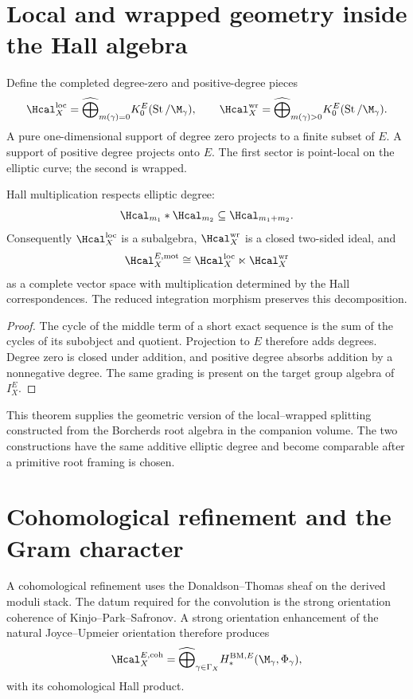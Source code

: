 \chapter{Local and wrapped geometry inside the Hall algebra}
Define the completed degree-zero and positive-degree pieces
\[
 \Hcal_X^{\mathrm{loc}}
 =\widehat\bigoplus_{m(\gamma)=0}
 K_0^E(\operatorname{St}/\M_\gamma),
 \qquad
 \Hcal_X^{\mathrm{wr}}
 =\widehat\bigoplus_{m(\gamma)>0}
 K_0^E(\operatorname{St}/\M_\gamma).
\]
A pure one-dimensional support of degree zero projects to a finite subset of $E$.  A support of positive degree projects onto $E$.  The first sector is point-local on the elliptic curve; the second is wrapped.

\begin{theorem}
Hall multiplication respects elliptic degree:
\[
 \Hcal_{m_1}*\Hcal_{m_2}\subseteq\Hcal_{m_1+m_2}.
\]
Consequently $\Hcal_X^{\mathrm{loc}}$ is a subalgebra, $\Hcal_X^{\mathrm{wr}}$ is a closed two-sided ideal, and
\[
 \Hcal_X^{E,\mathrm{mot}}
 \cong
 \Hcal_X^{\mathrm{loc}}\ltimes\Hcal_X^{\mathrm{wr}}
\]
as a complete vector space with multiplication determined by the Hall correspondences.  The reduced integration morphism preserves this decomposition.
\end{theorem}
\begin{proof}
The cycle of the middle term of a short exact sequence is the sum of the cycles of its subobject and quotient.  Projection to $E$ therefore adds degrees.  Degree zero is closed under addition, and positive degree absorbs addition by a nonnegative degree.  The same grading is present on the target group algebra of $I_X^E$.
\end{proof}

This theorem supplies the geometric version of the local--wrapped splitting constructed from the Borcherds root algebra in the companion volume.  The two constructions have the same additive elliptic degree and become comparable after a primitive root framing is chosen.

\chapter{Cohomological refinement and the Gram character}
A cohomological refinement uses the Donaldson--Thomas sheaf on the derived moduli stack.  The datum required for the convolution is the strong orientation coherence of Kinjo--Park--Safronov.  A strong orientation enhancement of the natural Joyce--Upmeier orientation therefore produces
\[
 \Hcal_X^{E,\mathrm{coh}}
 =\widehat\bigoplus_{\gamma\in\Gamma_X}
 H_*^{\mathrm{BM},E}(\M_\gamma,\Phi_\gamma),
\]
with its cohomological Hall product.

